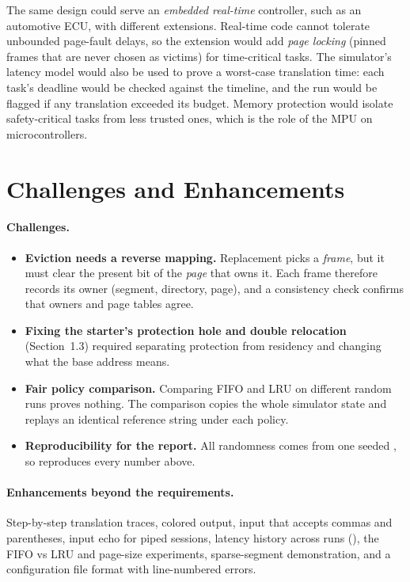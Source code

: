 \documentclass[11pt]{article}
\newcommand{\code}[1]{\texttt{\detokenize{#1}}}
\begin{document}
The same design could serve an \emph{embedded real-time} controller, such as an automotive ECU, with
different extensions. Real-time code cannot tolerate unbounded page-fault delays, so the extension would add
\emph{page locking} (pinned frames that are never chosen as victims) for time-critical tasks. The simulator's
latency model would also be used to prove a worst-case translation time: each task's deadline would be checked
against the timeline, and the run would be flagged if any translation exceeded its budget. Memory protection would
isolate safety-critical tasks from less trusted ones, which is the role of the MPU on microcontrollers.

\section{Challenges and Enhancements}

\paragraph{Challenges.}
\begin{itemize}
  \item \textbf{Eviction needs a reverse mapping.} Replacement picks a \emph{frame}, but it must clear
        the present bit of the \emph{page} that owns it. Each frame therefore records its owner
        (segment, directory, page), and a consistency check confirms that owners and page tables agree.
  \item \textbf{Fixing the starter's protection hole and double relocation} (Section~1.3) required
        separating protection from residency and changing what the base address means.
  \item \textbf{Fair policy comparison.} Comparing FIFO and LRU on different random runs proves
        nothing. The comparison copies the whole simulator state and replays an identical reference
        string under each policy.
  \item \textbf{Reproducibility for the report.} All randomness comes from one seeded
        \code{std::mt19937}, so \code{--seed 42} reproduces every number above.
\end{itemize}

\paragraph{Enhancements beyond the requirements.}
Step-by-step translation traces, colored output, input that accepts commas and parentheses, input echo for
piped sessions, latency history across runs (\code{latency_history.csv}), the FIFO vs LRU and page-size
experiments, sparse-segment demonstration, and a configuration file format with line-numbered errors.
\end{document}
